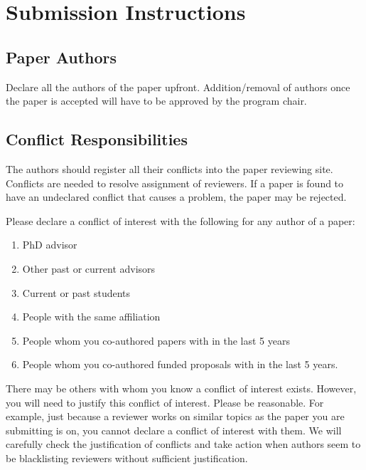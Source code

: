 \documentclass[pageno]{jpaper}
\begin{document}



\section{Submission Instructions}

\subsection{Paper Authors}

Declare all the authors of the paper upfront. Addition/removal of authors once
the paper is accepted will have to be approved by the program chair.

\subsection{Conflict Responsibilities}

The authors should register all their conflicts into the paper reviewing site.
Conflicts are needed to resolve assignment of reviewers. If a paper is found to
have an undeclared conflict that causes a problem, the paper may be rejected.

Please declare a conflict of interest with the following for any author of a paper:

\begin{enumerate}
\item PhD advisor
\item Other past or current advisors
\item Current or past students
\item People with the same affiliation
\item People whom you co-authored papers with in the last 5 years
\item People whom you co-authored funded proposals with in the last 5 years.
\end{enumerate}

There may be others with whom you know a conflict of interest exists.  However,
you will need to justify this conflict of interest.  Please be reasonable.  For
example, just because a reviewer works on similar topics as the paper you are
submitting is on, you cannot declare a conflict of interest with
them. We will carefully check the justification of conflicts and take
action when authors seem to be blacklisting reviewers without
sufficient justification. 
\end{document}
